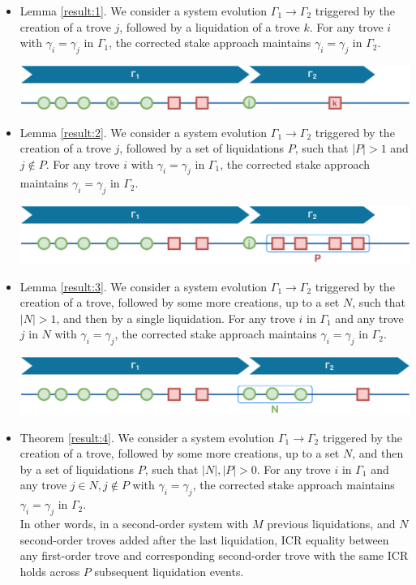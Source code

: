 \documentclass[reqno]{article}
\begin{document}
\begin{itemize}
  \item Lemma \ref{result:1}. We consider a system evolution $\Gamma_1 \rightarrow \Gamma_2$ triggered by the creation of a trove $j$, followed by a liquidation of a trove $k$. For any trove $i$ with $\gamma_i = \gamma_j$ in $\Gamma_1$, the corrected stake approach maintains $\gamma_i = \gamma_j$ in $\Gamma_2$.

    \includegraphics[width=\linewidth]{System_order_evolution_1.png}

  \item Lemma \ref{result:2}. We consider a system evolution $\Gamma_1 \rightarrow \Gamma_2$ triggered by the creation of a trove $j$, followed by a set of liquidations $P$, such that $|P| > 1$ and $j \notin P$. For any trove $i$ with $\gamma_i = \gamma_j$ in $\Gamma_1$, the corrected stake approach maintains $\gamma_i = \gamma_j$ in $\Gamma_2$.

    \includegraphics[width=\linewidth]{System_order_evolution_2.png}

  \item Lemma \ref{result:3}. We consider a system evolution $\Gamma_1 \rightarrow \Gamma_2$ triggered by the creation of a trove, followed by some more creations, up to a set $N$, such that $|N| > 1$, and then by a single liquidation. For any trove $i$ in $\Gamma_1$ and any trove $j$ in $N$ with $\gamma_i = \gamma_j$, the corrected stake approach maintains $\gamma_i = \gamma_j$ in $\Gamma_2$.

    \includegraphics[width=\linewidth]{System_order_evolution_3.png}

  \item Theorem \ref{result:4}. We consider a system evolution $\Gamma_1 \rightarrow \Gamma_2$ triggered by the creation of a trove, followed by some more creations, up to a set $N$, and then by a set of liquidations $P$, such that $|N|, |P| > 0$. For any trove $i$ in $\Gamma_1$ and any trove $j \in N, j\notin P$ with $\gamma_i = \gamma_j$, the corrected stake approach maintains $\gamma_i = \gamma_j$ in $\Gamma_2$. \\
    In other words, in a second-order system with $M$ previous liquidations, and $N$ second-order troves added after the last liquidation, ICR equality between any first-order trove and corresponding second-order trove with the same ICR holds across $P$ subsequent liquidation events.


\end{itemize}
\end{document}
